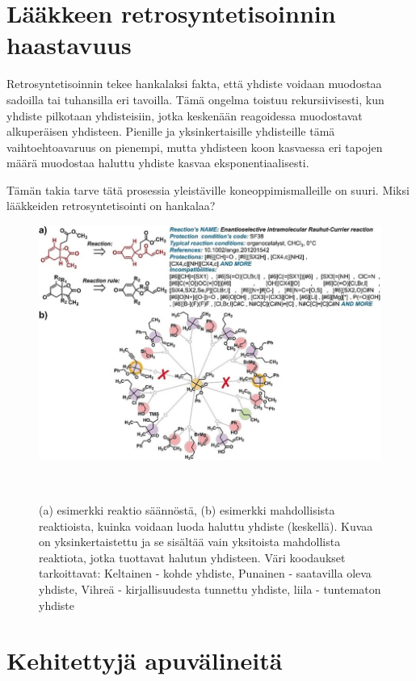 \documentclass[finnish,twoside,censored,subject,sw-line]{HYthesisML}
\begin{document}
\section{Lääkkeen retrosyntetisoinnin haastavuus}

Retrosyntetisoinnin tekee hankalaksi fakta, että yhdiste voidaan muodostaa sadoilla tai tuhansilla eri tavoilla.
Tämä ongelma toistuu rekursiivisesti, kun yhdiste pilkotaan yhdisteisiin, jotka keskenään reagoidessa muodostavat alkuperäisen yhdisteen.
Pienille ja yksinkertaisille yhdisteille tämä vaihtoehtoavaruus on pienempi, mutta yhdisteen koon kasvaessa eri tapojen määrä muodostaa haluttu yhdiste kasvaa eksponentiaalisesti.

Tämän takia tarve tätä prosessia yleistäville koneoppimismalleille on suuri.
Miksi lääkkeiden retrosyntetisointi on hankalaa?~\cite{ButlerKeithT2018Mlfm,deAlmeidaA.Filipa2019Socd}
\begin{figure}
  \centering
  \includegraphics[width=\textwidth]{retrosynthesis.jpg}
  \caption{(a) esimerkki reaktio säännöstä, (b) esimerkki mahdollisista reaktioista, kuinka voidaan luoda haluttu yhdiste (keskellä).
    Kuvaa on yksinkertaistettu ja se sisältää vain yksitoista mahdollista reaktiota, jotka tuottavat halutun yhdisteen.
    Väri koodaukset tarkoittavat: Keltainen - kohde yhdiste, Punainen - saatavilla oleva yhdiste, Vihreä - kirjallisuudesta tunnettu yhdiste, liila - tuntematon yhdiste}
  ~\cite{ExpertKnowledgeRetorsynthesis}
\end{figure}

\section{Kehitettyjä apuvälineitä}
\end{document}
